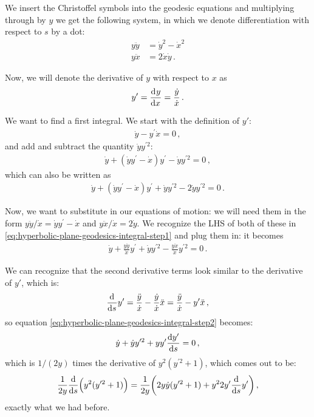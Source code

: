 \documentclass[main.tex]{subfiles}
\begin{document}
We insert the Christoffel symbols into the geodesic equations and multiplying through by \(y\) we get the following system, in which we denote differentiation with respect to \(s\) by a dot: 
%
\begin{subequations}
\begin{align}
  y \ddot{y} &= \dot{y}^2 - \dot{x}^2  \\
  y \ddot{x} &= 2 \dot{x} \dot{y} 
\,.
\end{align}
\end{subequations}

Now, we will denote the derivative of \(y \) with respect to \(x\) as 
%
\begin{align}
  y' = \dv[]{y}{x} = \frac{\dot{y}}{\dot{x}}
\,.
\end{align}

We want to find a first integral. We start with the definition of \(y'\): 
%
\begin{align}
  \dot{y} - y^{\prime } \dot{x} = 0
\,,
\end{align}
%
and add and subtract the quantity \(\dot{y} y^{\prime 2}\): 
%
\begin{align}
  \dot{y} + (\dot{y} y^{\prime } - \dot{x}) y^{\prime } - \dot{y} y^{\prime 2} =0
\,,
\end{align}
%
which can also be written as 
%
\begin{align} \label{eq:hyperbolic-plane-geodesics-integral-step1}
  \dot{y} + (\dot{y} y^{\prime } - \dot{x}) y^{\prime } + \dot{y} y^{\prime 2} - 2 \dot{y} y^{\prime 2} = 0
\,.
\end{align}

Now, we want to substitute in our equations of motion: we will need them in the form \(y \ddot{y} / \dot{x} = \dot{y} y^{\prime } - \dot{x}\) and \(y \ddot{x} / \dot{x} = 2 \dot{y}\).
We recognize the LHS of both of these in \eqref{eq:hyperbolic-plane-geodesics-integral-step1} and plug them in: it becomes
%
\begin{align} \label{eq:hyperbolic-plane-geodesics-integral-step2}
  \dot{y} + \frac{y \ddot{y}}{\dot{x}} y^{\prime } + \dot{y} y^{\prime 2} - \frac{y \ddot{x}}{\dot{x}} y^{\prime 2} = 0
\,.
\end{align}

We can recognize that the second derivative terms look similar to the derivative of \(y'\), which is:
%
\begin{align}
  \dv[]{}{s} y^{\prime } 
  = \frac{\ddot{y}}{\dot{x}} - \frac{\dot{y}}{\dot{x}
  } \ddot{x}
  = \frac{\ddot{y}}{\dot{x}} - y^{\prime } \ddot{x}
\,,
\end{align}
%
so equation \eqref{eq:hyperbolic-plane-geodesics-integral-step2} becomes:
%
\begin{align}
  \dot{y} + \dot{y} y^{\prime 2} + y y^{\prime } \dv{y'}{s}=0
\,,
\end{align}
%
which is \(1/(2y)\) times the derivative of \(y^2 (y^{\prime 2} + 1)\), which comes out to be: 
%
\begin{align}
  \frac{1}{2y}
  \dv{}{s} \qty(y^2 (y^{\prime 2} + 1))
  = \frac{1}{2y}\qty(2 y \dot{y} 
  (y^{\prime 2} + 1)
  + y^2 2 y^{\prime } \dv{}{s} y^{\prime })
\,,
\end{align}
%
exactly what we had before.
\end{document}
